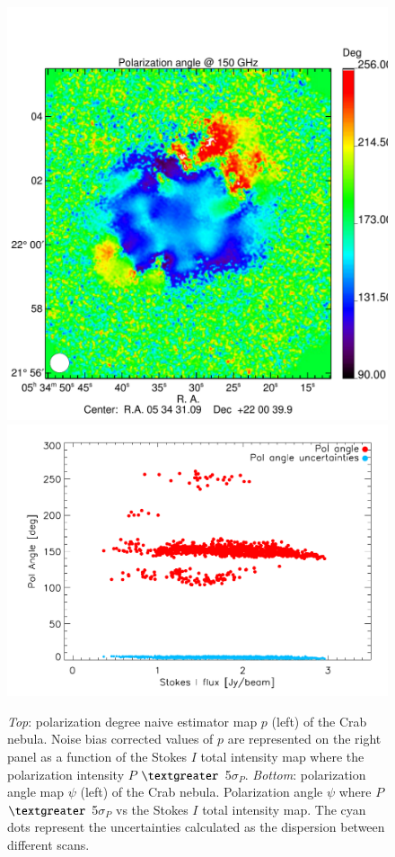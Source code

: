 \documentclass[twocolumn,traditabstract]{aa}
\begin{document}
\begin{figure}
\includegraphics[clip, angle=0, scale = 0.35]{figures/Crab_angle2_2mm.pdf}
\includegraphics[clip, angle=0, scale = 0.5]{figures/pol_angle_vs_I_2mm.pdf}
\caption{{\it Top}: polarization degree naive estimator map $p$ (left) of the Crab nebula. Noise bias corrected values of $p$ are represented on the right panel as a function of the Stokes $I$ total intensity map where the polarization intensity $P$ $\textgreater$ 5$\sigma_{P}$. {\it Bottom}: polarization angle map $\psi$ (left) of the Crab nebula. Polarization angle $\psi$ where $P$ $\textgreater$ 5$\sigma_{P}$ vs the Stokes $I$ total intensity map. The cyan dots represent the uncertainties calculated as the dispersion between different scans.}
\label{fig:pol_degree}
\end{figure}
\end{document}
